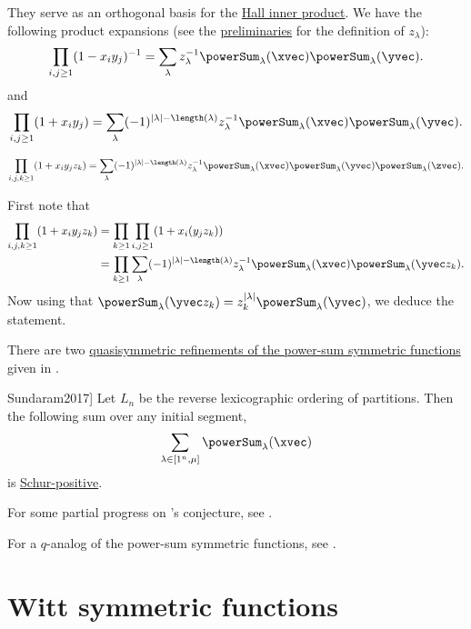 They serve as an orthogonal basis for the
\hyperref[hallInnerProduct]{Hall inner product}.
We have the following product expansions \cite[Sec.~1.4]{Macdonald1995}
(see the \hyperref[prelimPartitionStatistics]{preliminaries} for the
definition of $z_\lambda$):
\[
\prod_{i,j\geq 1}(1-x_i y_j)^{-1}
=
\sum_{\lambda} z_\lambda^{-1}
\powerSum_\lambda(\xvec)\powerSum_\lambda(\yvec).
\]
and
\[
\prod_{i,j\geq 1}(1+x_i y_j)
=
\sum_{\lambda} (-1)^{|\lambda|-\length(\lambda)} z_\lambda^{-1}
\powerSum_\lambda(\xvec)\powerSum_\lambda(\yvec).
\]

\begin{lemma}
\[
\prod_{i,j,k\geq 1}(1+x_i y_j z_k)
=
\sum_{\lambda}
(-1)^{|\lambda|-\length(\lambda)} z_\lambda^{-1}
\powerSum_\lambda(\xvec)\powerSum_\lambda(\yvec)\powerSum_\lambda(\zvec).
\]
\end{lemma}
\begin{proof*}
First note that
\begin{align}
\prod_{i,j,k\geq 1}(1+x_i y_j z_k)
&=
\prod_{k\geq 1} \prod_{i,j\geq 1}(1+x_i (y_j z_k)) \\
&=
\prod_{k\geq 1}
\sum_{\lambda} (-1)^{|\lambda|-\length(\lambda)} z_\lambda^{-1}
\powerSum_\lambda(\xvec)\powerSum_\lambda(\yvec z_k).
\end{align}
Now using that
$\powerSum_\lambda(\yvec z_k) = z_k^{|\lambda|}\powerSum_\lambda(\yvec)$,
we deduce the statement.
\end{proof*}


There are two
\hyperref[qPsi]{quasisymmetric refinements of the power-sum symmetric functions}
given in \cite{BallantineDaughertyHicksMason2020}.

\begin{conjecture}[Sundaram 2017, \cite[Conj.~1]{Sundaram2017}]
 Let $L_n$ be the reverse lexicographic ordering of partitions.
Then the following sum over any initial segment,
\[
\sum_{\lambda \in [1^n,\mu]} \powerSum_\lambda(\xvec)
\]
is \hyperref[schurPositiveDefinition]{Schur-positive}.
\end{conjecture}
For some partial progress on 's conjecture, see
\cite{Sundaram2020}.

For a $q$-analog of the power-sum symmetric functions, see \cite{Brugidou2023x}.


\section[wittSymmetric]{Witt symmetric functions}

